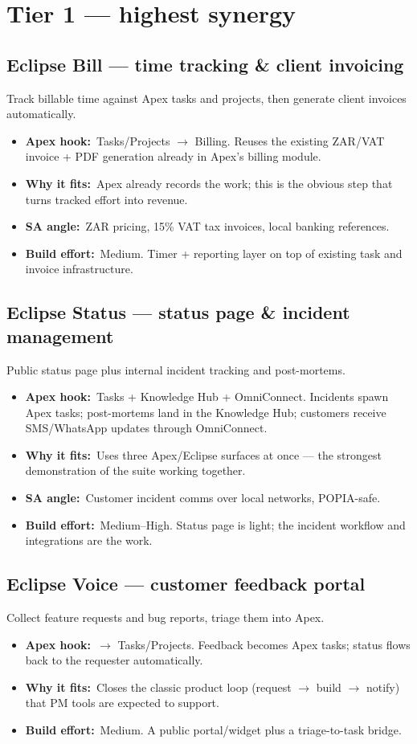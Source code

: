 \documentclass[11pt]{article}
\newcommand{\hook}[1]{\textbf{Apex hook:}~#1}
\newcommand{\fit}[1]{\textbf{Why it fits:}~#1}
\newcommand{\sa}[1]{\textbf{SA angle:}~#1}
\newcommand{\effort}[1]{\textbf{Build effort:}~#1}
\begin{document}
\section{Tier 1 --- highest synergy}

\subsection{Eclipse Bill --- time tracking \& client invoicing}
Track billable time against Apex tasks and projects, then generate client
invoices automatically.
\begin{itemize}
  \item \hook{Tasks/Projects $\rightarrow$ Billing.} Reuses the existing ZAR/VAT invoice + PDF generation already in Apex's billing module.
  \item \fit{Apex already records the work; this is the obvious step that turns tracked effort into revenue.}
  \item \sa{ZAR pricing, 15\% VAT tax invoices, local banking references.}
  \item \effort{Medium. Timer + reporting layer on top of existing task and invoice infrastructure.}
\end{itemize}

\subsection{Eclipse Status --- status page \& incident management}
Public status page plus internal incident tracking and post-mortems.
\begin{itemize}
  \item \hook{Tasks + Knowledge Hub + OmniConnect.} Incidents spawn Apex tasks; post-mortems land in the Knowledge Hub; customers receive SMS/WhatsApp updates through OmniConnect.
  \item \fit{Uses three Apex/Eclipse surfaces at once --- the strongest demonstration of the suite working together.}
  \item \sa{Customer incident comms over local networks, POPIA-safe.}
  \item \effort{Medium--High. Status page is light; the incident workflow and integrations are the work.}
\end{itemize}

\subsection{Eclipse Voice --- customer feedback portal}
Collect feature requests and bug reports, triage them into Apex.
\begin{itemize}
  \item \hook{$\rightarrow$ Tasks/Projects.} Feedback becomes Apex tasks; status flows back to the requester automatically.
  \item \fit{Closes the classic product loop (request $\rightarrow$ build $\rightarrow$ notify) that PM tools are expected to support.}
  \item \effort{Medium. A public portal/widget plus a triage-to-task bridge.}
\end{itemize}
\end{document}
